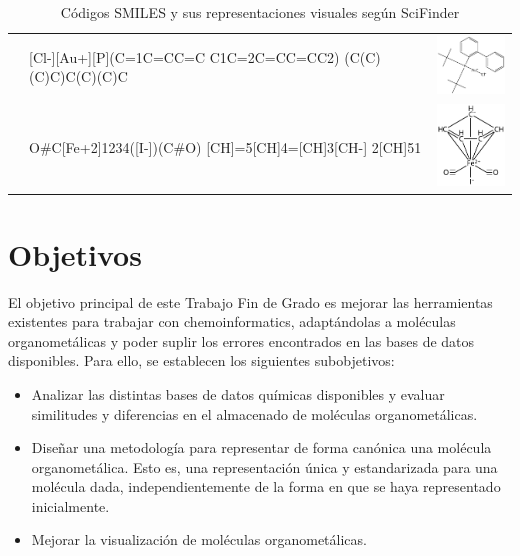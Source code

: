 \begin{landscape}
\begin{table}
\begin{minipage}{.5\linewidth}
\begin{tabular}{m{0.1cm}m{4.8cm}>{\centering\arraybackslash}m{4cm}}
        &
        [Cl-][Au+][P](C=1C=CC=C C1C=2C=CC=CC2) (C(C)(C)C)C(C)(C)C & \includegraphics[width=2.2cm]{imagenes/sciFinder/pdf/Chloro[(1,1-biphenyl-2-yl)di-tert-butylphosphine]gold(I).pdf} \\
        
        &
        O\#C[Fe+2]1234([I-])(C\#O) [CH]=5[CH]4=[CH]3[CH-] 2[CH]51 & \includegraphics[width=2.2cm]{imagenes/sciFinder/pdf/Dicarbonylcyclopentadienyliodoiron(II).pdf} \\
        \bottomrule
        \end{tabular}
    \caption{Códigos SMILES y sus representaciones visuales según SciFinder}
    \label{tabla:tabla_peq_intro_sciFinder}
  \end{minipage}
\end{table}
\end{landscape}





\section{Objetivos}\label{objetivos}
El objetivo principal de este Trabajo Fin de Grado es mejorar las herramientas existentes para trabajar con chemoinformatics, adaptándolas a moléculas organometálicas y poder suplir los errores encontrados en las bases de datos disponibles. Para ello, se establecen los siguientes subobjetivos:
\begin{itemize}
    \item Analizar las distintas bases de datos químicas disponibles y evaluar similitudes y diferencias en el almacenado de moléculas organometálicas.
    \item Diseñar una metodología para representar de forma canónica una molécula organometálica. Esto es, una representación única y estandarizada para una molécula dada, independientemente de la forma en que se haya representado inicialmente.
    \item Mejorar la visualización de moléculas organometálicas.
\end{itemize} 

